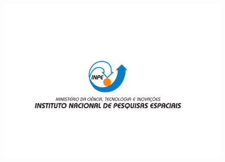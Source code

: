 \documentclass[10pt,aspectratio=169]{beamer}
\begin{document}
\begingroup
{}
{\nologo
\begin{frame}
	\begin{figure}[H]
    	\vspace{-4em}
		\centering
        	\hspace*{1.5em}\includegraphics[width=1.\textwidth]{DesinacaoNominativaCentralizada2020.pdf}
	\end{figure}
\end{frame}
}
\endgroup
\end{document}
